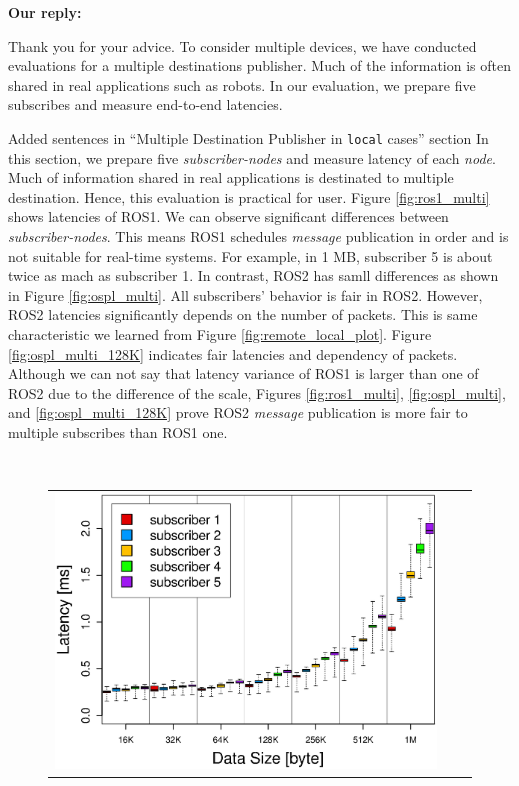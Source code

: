 \documentclass{article}
\begin{document}
\begin{enumerate}
  \begin{flushleft}
    \textbf{Our reply:}
  \end{flushleft}
  Thank you for your advice.
  To consider multiple devices, we have conducted evaluations for a multiple destinations publisher.
  Much of the information is often shared in real applications such as robots.
  In our evaluation, we prepare five subscribes and measure end-to-end latencies.
  \begin{itembox}[|]{Added sentences in ``Multiple Destination Publisher in \texttt{local} cases'' section}
    In this section, we prepare five \emph{subscriber-nodes} and measure latency of each \emph{node}.
    Much of information shared in real applications is destinated to multiple destination.
    Hence, this evaluation is practical for user.
    Figure \ref{fig:ros1_multi} shows latencies of ROS1.
    We can observe significant differences between \emph{subscriber-nodes}.
    This means ROS1 schedules \emph{message} publication in order and is not suitable for real-time systems.
    For example, in 1 MB, subscriber 5 is about twice as mach as subscriber 1.
    In contrast, ROS2 has samll differences as shown in Figure \ref{fig:ospl_multi}.
    All subscribers' behavior is fair in ROS2.
    However, ROS2 latencies significantly depends on the number of packets.
    This is same characteristic we learned from Figure \ref{fig:remote_local_plot}.
    Figure \ref{fig:ospl_multi_128K} indicates fair latencies and dependency of packets.
    Although we can not say that latency variance of ROS1 is larger than one of ROS2 due to the difference of the scale, Figures \ref{fig:ros1_multi}, \ref{fig:ospl_multi}, and \ref{fig:ospl_multi_128K} prove ROS2 \emph{message} publication is more fair to multiple subscribes than ROS1 one.
  \end{itembox}\\
  \setcounter{figure}{15}
  \begin{figure}[h]
    \begin{tabular}{ccc}
      \begin{minipage}[t]{0.31\textwidth}
        \includegraphics[width=1.0\linewidth]{../../figure/BoxPlot_ros1_1M_multi-pub5.eps}

\end{minipage}
\end{tabular}
\end{figure}
\end{enumerate}
\end{document}
